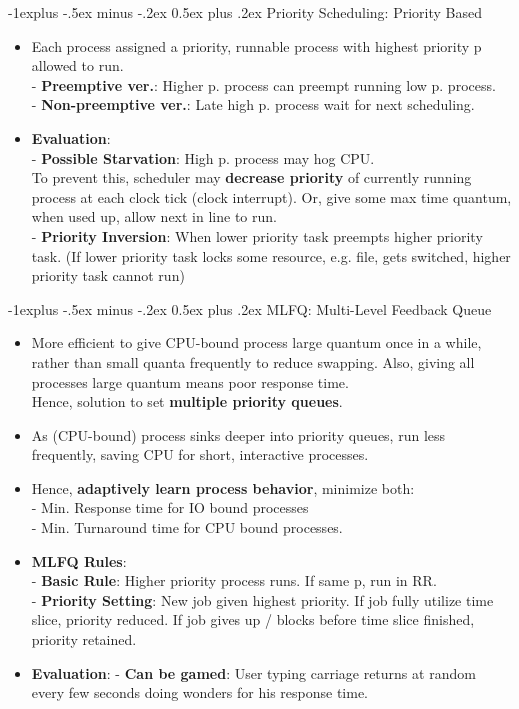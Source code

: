 \documentclass[10pt, landscape]{article}
\makeatletter
\renewcommand{\subsection}{\@startsection{subsection}{2}{0mm}%
                                {-1explus -.5ex minus -.2ex}%
                                {0.5ex plus .2ex}%
                                {\normalfont\normalsize\bfseries}}
\makeatother
\begin{document}
\begin{multicols*}{3}
\subsection{Priority Scheduling: Priority Based}
\begin{itemize}
\item Each process assigned a priority, runnable process with highest priority p allowed to run. \\
- \textbf{Preemptive ver.}: Higher p. process can preempt running low p. process. \\
- \textbf{Non-preemptive ver.}: Late high p. process wait for next scheduling.

\item \textbf{Evaluation}: \\
- \textbf{Possible Starvation}: High p. process may hog CPU. \\
To prevent this, scheduler may \textbf{decrease priority} of currently running process at each clock tick (clock interrupt). Or, give some max time quantum, when used up, allow next in line to run. \\
- \textbf{Priority Inversion}: When lower priority task preempts higher priority task. (If lower priority task locks some resource, e.g. file, gets switched, higher priority task cannot run)
\end{itemize}

\columnbreak

\subsection{MLFQ: Multi-Level Feedback Queue}
\begin{itemize}
\item More efficient to give CPU-bound process large quantum once in a while, rather than small quanta frequently to reduce swapping. Also, giving all processes large quantum means poor response time. \\
Hence, solution to set \textbf{multiple priority queues}.
\item As (CPU-bound) process sinks deeper into priority queues, run less frequently, saving CPU for short, interactive processes.
\item Hence, \textbf{adaptively learn process behavior}, minimize both: \\
- Min. Response time for IO bound processes \\
- Min. Turnaround time for CPU bound processes.
\item \textbf{MLFQ Rules}: \\
- \textbf{Basic Rule}: Higher priority process runs. If same p, run in RR. \\
- \textbf{Priority Setting}: New job given highest priority. If job fully utilize time slice, priority reduced. If job gives up / blocks before time slice finished, priority retained.
\item \textbf{Evaluation}:
- \textbf{Can be gamed}: User typing carriage returns at random every few seconds doing wonders for his response time.
\end{itemize}



\end{multicols*}
\end{document}
